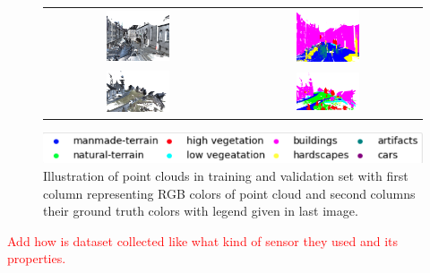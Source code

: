 \begin{figure}
\begin{tabular}{cc}
        \includegraphics[width=0.35\textwidth, height=0.15\textheight]{images/sem3d_data/4.png} & \includegraphics[width=0.35\textwidth, height=0.15\textheight]{images/sem3d_data/4_gt.png}\\
        \includegraphics[width=0.35\textwidth, height=0.15\textheight]{images/sem3d_data/5.png} & \includegraphics[width=0.35\textwidth, height=0.15\textheight]{images/sem3d_data/5_gt.png}\\
    \end{tabular}
    \includegraphics[scale=0.65]{images/legend.png}
    \caption{Illustration of point clouds in training and validation set with first column representing RGB colors of point cloud and second columns their ground truth colors with legend given in last image.}
    \label{fig:sem3d_gt_vis}
\end{figure}
\textcolor{red}{Add how is dataset collected like what kind of sensor they used and its properties.}
